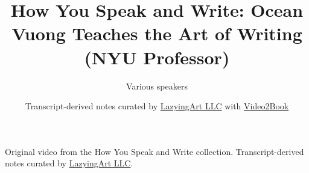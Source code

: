 \documentclass[11pt,oneside]{book}
\begin{document}
\frontmatter
\title{How You Speak and Write: Ocean Vuong Teaches the Art of Writing (NYU Professor)}
\author{Various speakers}
\date{Transcript-derived notes curated by \href{https://lazying.art}{LazyingArt LLC} with \href{https://github.com/lachlanchen/Video2Book}{Video2Book}}
\maketitle
\begin{center}
\small Original video from the How You Speak and Write collection. Transcript-derived notes curated by \href{https://lazying.art}{LazyingArt LLC}.
\end{center}
\clearpage
\mainmatter

\end{document}
